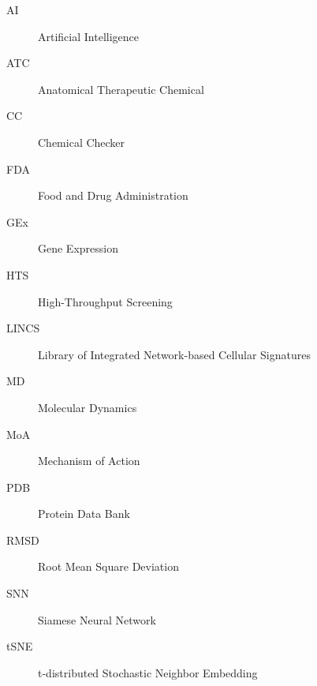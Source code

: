 

\begin{description}
    \item[AI] Artificial Intelligence
    \item[ATC] Anatomical Therapeutic Chemical
    \item[CC] Chemical Checker
    \item[FDA] Food and Drug Administration
    \item[GEx] Gene Expression
    \item[HTS] High-Throughput Screening
    \item[LINCS] Library of Integrated Network-based Cellular Signatures
    \item[MD] Molecular Dynamics
    \item[MoA] Mechanism of Action
    \item[PDB] Protein Data Bank
    \item[RMSD] Root Mean Square Deviation 
    \item[SNN] Siamese Neural Network
    \item[tSNE] t-distributed Stochastic Neighbor Embedding
\end{description}

